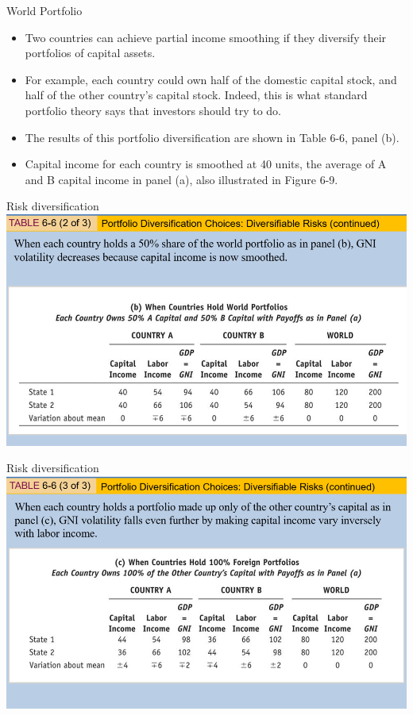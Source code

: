 \documentclass[
  ignorenonframetext,
]{beamer}
\begin{document}
\begin{frame}{World Portfolio}
\label{world-portfolio}
\begin{itemize}
\item
  Two countries can achieve partial income smoothing if they diversify
  their portfolios of capital assets.
\item
  For example, each country could own half of the domestic capital
  stock, and half of the other country's capital stock. Indeed, this is
  what standard portfolio theory says that investors should try to do.
\item
  The results of this portfolio diversification are shown in Table 6-6,
  panel (b).
\item
  Capital income for each country is smoothed at 40 units, the average
  of A and B capital income in panel (a), also illustrated in Figure
  6-9.
\end{itemize}
\end{frame}

\begin{frame}{Risk diversification}
\label{risk-diversification-1}
\includegraphics{pic6.png}
\end{frame}

\begin{frame}{Risk diversification}
\label{risk-diversification-2}
\includegraphics{pic7.png}
\end{frame}
\end{document}
